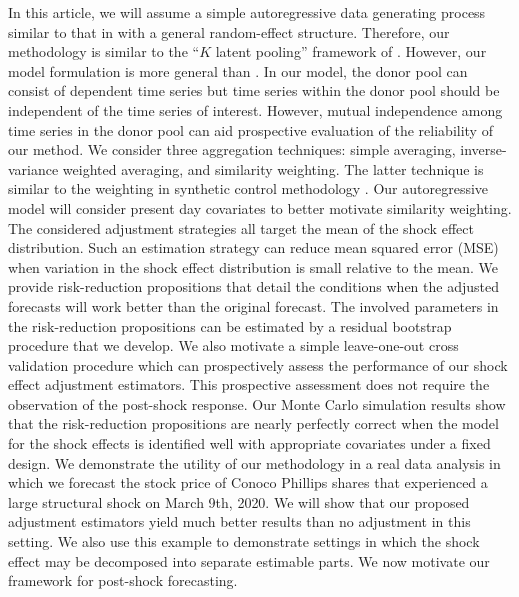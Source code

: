 \documentclass[11pt]{article}
\theoremstyle{definition}
\begin{document}
In this article, we will assume a simple autoregressive data generating process similar to that in \citet{blundell1998initial} with a general random-effect structure. Therefore, our methodology is similar to the ``$K$ latent pooling'' framework of \cite{ramaswamy1993empirical}. However, our model formulation is more general than \cite{ramaswamy1993empirical}. In our model, the donor pool can consist of dependent time series but time series within the donor pool should be independent of the time series of interest. However, mutual independence among time series in the donor pool can aid prospective evaluation of the reliability of our method. We consider three aggregation techniques: simple averaging, inverse-variance weighted averaging, and similarity weighting. The latter technique is similar to the weighting in synthetic control methodology \citep{abadie2010synthetic}. Our autoregressive model will consider present day covariates to better motivate similarity weighting. The considered adjustment strategies all target the mean of the shock effect distribution. Such an estimation strategy can reduce mean squared error (MSE) when variation in the shock effect distribution is small relative to the mean. We provide risk-reduction propositions that detail the conditions when the adjusted forecasts will work better than the original forecast. The involved parameters in the risk-reduction propositions can be estimated by a residual bootstrap procedure that we develop. We also motivate a simple leave-one-out cross validation procedure which can prospectively assess the performance of our shock effect adjustment estimators. This prospective assessment does not require the observation of the post-shock response. Our Monte Carlo simulation results show that the risk-reduction propositions are nearly perfectly correct when the model for the shock effects is identified well with appropriate covariates under a fixed design. We demonstrate the utility of our methodology in a real data analysis in which we forecast the stock price of Conoco Phillips shares that experienced a large structural shock on March 9th, 2020. We will show that our proposed adjustment estimators yield much better results than no adjustment in this setting. We also use this example to demonstrate settings in which the shock effect may be decomposed into separate estimable parts. We now motivate our framework for post-shock forecasting.


\end{document}
